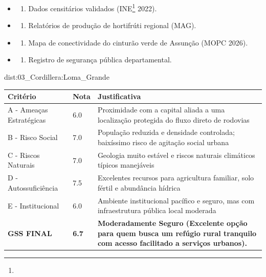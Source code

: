 {\begin{itemize}
\tightlist
\item
  \begin{enumerate}
  \def\labelenumi{\arabic{enumi})}
  \tightlist
  \item
    Dados censitários validados (INE\footnote{\fineINE} 2022).
  \end{enumerate}
\item
  \begin{enumerate}
  \def\labelenumi{\arabic{enumi})}
  \setcounter{enumi}{1}
  \tightlist
  \item
    Relatórios de produção de hortifrúti regional (MAG).
  \end{enumerate}
\item
  \begin{enumerate}
  \def\labelenumi{\arabic{enumi})}
  \setcounter{enumi}{2}
  \tightlist
  \item
    Mapa de conectividade do cinturão verde de Assunção (MOPC 2026).
  \end{enumerate}
\item
  \begin{enumerate}
  \def\labelenumi{\arabic{enumi})}
  \setcounter{enumi}{3}
  \tightlist
  \item
    Registro de segurança pública departamental.
  \end{enumerate}
\end{itemize}}{dist:03_Cordillera:Loma_Grande}
\begin{table}[ht!]
\small \begin{tabular}{p{3.0cm}p{0.8cm}p{6.0cm}} \toprule
\textbf{Critério} & \textbf{Nota} & \textbf{Justificativa} \\ \midrule
A - Ameaças Estratégicas & 6.0 & Proximidade com a capital aliada a uma localização protegida do fluxo direto de rodovias \\
B - Risco Social & 7.0 & População reduzida e densidade controlada; baixíssimo risco de agitação social urbana \\
C - Riscos Naturais & 7.0 & Geologia muito estável e riscos naturais climáticos típicos manejáveis \\
D - Autossuficiência & 7.5 & Excelentes recursos para agricultura familiar, solo fértil e abundância hídrica \\
E - Institucional & 6.0 & Ambiente institucional pacífico e seguro, mas com infraestrutura pública local moderada \\
\midrule \textbf{GSS FINAL} & \textbf{6.7} & \textbf{Moderadamente Seguro (Excelente opção para quem busca um refúgio rural tranquilo com acesso facilitado a serviços urbanos).} \\ \bottomrule \end{tabular}
\end{table}
